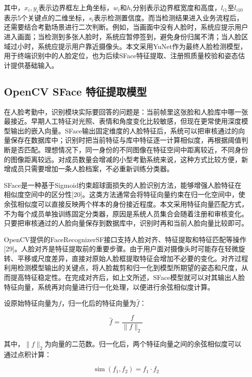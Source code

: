 \documentclass[UTF8]{heuthesis}
\begin{document}
其中，\(x_i,y_i\)表示边界框左上角坐标，\(w_i\)和\(h_i\)分别表示边界框宽度和高度，\(l_{i1}\)至\(l_{i10}\)表示5个关键点的二维坐标，\(s_i\)表示检测置信度。而当检测结果进入业务流程后，还需要结合考勤场景进行二次判断。例如，当画面中没有人脸时，系统应提示用户进入画面；当检测到多张人脸时，系统应暂停签到，避免身份归属不清；当人脸区域过小时，系统应提示用户靠近摄像头。本文采用YuNet作为最终人脸检测模型，用于终端识别中的人脸定位，也为后续SFace特征提取、注册照质量校验和姿态估计提供基础输入。

\subsection{OpenCV SFace 特征提取模型}
在人脸考勤中，识别模块实际要回答的问题是：当前帧里这张脸和人脸库中哪一张最接近。早期人工特征对光照、表情和角度变化比较敏感，但现在更常使用深度模型输出的嵌入向量。SFace输出固定维度的人脸特征后，系统可以把审核通过的向量保存在数据库中；识别时把当前特征与库中特征逐一计算相似度，再根据阈值判断是否匹配。理想情况下，同一身份的不同图像在特征空间中距离较近，不同身份的图像距离较远。对成员数量会增减的小型考勤系统来说，这种方式比较方便，新增成员只需要增加一条人脸档案，不必重新训练分类器。

SFace是一种基于Sigmoid约束超球面损失的人脸识别方法，能够增强人脸特征在相似度空间中的区分性[20]。这类方法通常会将特征向量约束在归一化空间中，使余弦相似度可以直接反映两个样本的身份接近程度。本文采用特征向量匹配方式，不为每个成员单独训练固定分类器，原因是系统人员集合会随着注册和审核变化。只要把审核通过的人脸向量保存到数据库中，识别时再和当前人脸向量比较即可。

OpenCV提供的FaceRecognizerSF接口支持人脸对齐、特征提取和特征匹配等操作[29]。人脸对齐是特征提取前的重要步骤。由于用户面对摄像头时可能存在轻微旋转、平移或尺度差异，直接对原始人脸框提取特征会增加不必要的变化。对齐过程利用检测模型输出的关键点，将人脸裁剪和归一化到模型所期望的姿态和尺度，从而提高特征稳定性。在完成对齐后，如上文所述，SFace模型就可以对其输出人脸特征向量，系统再对向量进行归一化处理，以便进行余弦相似度计算。

设原始特征向量为\(f\)，归一化后的特征向量为\(\hat f\)：

\begin{equation*}
\hat f=\frac{f}{\lVert f\rVert_2}\tag{2.2}
\end{equation*}

其中，\(\lVert f\rVert_2\)为向量的二范数。归一化后，两个特征向量之间的余弦相似度可以通过点积计算：

\begin{equation*}
\operatorname{sim}(f_1,f_2)=f_1\cdot f_2\tag{2.3}
\end{equation*}
\end{document}

